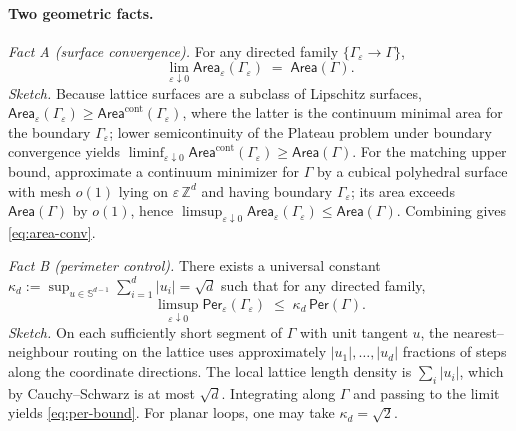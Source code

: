 \documentclass[11pt]{amsart}
\begin{document}
\paragraph{Two geometric facts.}
\emph{Fact A (surface convergence).} For any directed family $\{\Gamma_\varepsilon\to\Gamma\}$,
\begin{equation}
\label{eq:area-conv}
  \lim_{\varepsilon\downarrow 0}\mathsf{Area}_\varepsilon(\Gamma_\varepsilon)\;=\;\mathsf{Area}(\Gamma).
\end{equation}
\emph{Sketch.} Because lattice surfaces are a subclass of Lipschitz surfaces, $\mathsf{Area}_\varepsilon(\Gamma_\varepsilon)\ge \mathsf{Area}^{\text{cont}}(\Gamma_\varepsilon)$, where the latter is the continuum minimal area for the boundary $\Gamma_\varepsilon$; lower semicontinuity of the Plateau problem under boundary convergence yields $\liminf_{\varepsilon\downarrow 0}\mathsf{Area}^{\text{cont}}(\Gamma_\varepsilon)\ge \mathsf{Area}(\Gamma)$. For the matching upper bound, approximate a continuum minimizer for $\Gamma$ by a cubical polyhedral surface with mesh $o(1)$ lying on $\varepsilon\,\mathbb{Z}^d$ and having boundary $\Gamma_\varepsilon$; its area exceeds $\mathsf{Area}(\Gamma)$ by $o(1)$, hence $\limsup_{\varepsilon\downarrow 0}\mathsf{Area}_\varepsilon(\Gamma_\varepsilon)\le \mathsf{Area}(\Gamma)$. Combining gives \eqref{eq:area-conv}.

\emph{Fact B (perimeter control).} There exists a universal constant $\kappa_d:=\sup_{u\in\mathbb{S}^{d-1}}\sum_{i=1}^d |u_i|=\sqrt{d}$ such that for any directed family,
\begin{equation}
\label{eq:per-bound}
  \limsup_{\varepsilon\downarrow 0}\mathsf{Per}_\varepsilon(\Gamma_\varepsilon)\;\le\;\kappa_d\,\mathsf{Per}(\Gamma).
\end{equation}
\emph{Sketch.} On each sufficiently short segment of $\Gamma$ with unit tangent $u$, the nearest--neighbour routing on the lattice uses approximately $|u_1|, \dots, |u_d|$ fractions of steps along the coordinate directions. The local lattice length density is $\sum_i |u_i|$, which by Cauchy--Schwarz is at most $\sqrt{d}$. Integrating along $\Gamma$ and passing to the limit yields \eqref{eq:per-bound}. For planar loops, one may take $\kappa_d=\sqrt{2}$.
\end{document}
